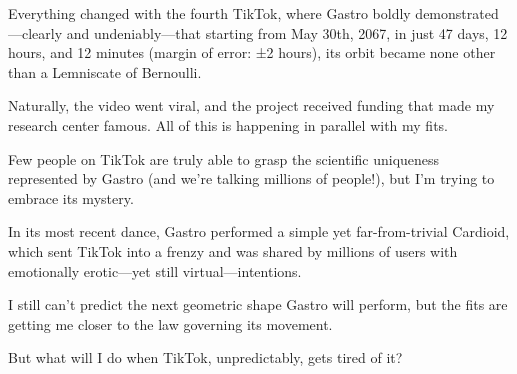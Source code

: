 {Everything changed with the fourth TikTok, where Gastro boldly demonstrated—clearly and undeniably—that starting from May 30th, 2067, in just 47 days, 12 hours, and 12 minutes (margin of error: ±2 hours), its orbit became none other than a Lemniscate of Bernoulli.

Naturally, the video went viral, and the project received funding that made my research center famous. All of this is happening in parallel with my fits.

Few people on TikTok are truly able to grasp the scientific uniqueness represented by Gastro (and we’re talking millions of people!), but I’m trying to embrace its mystery.

In its most recent dance, Gastro performed a simple yet far-from-trivial Cardioid, which sent TikTok into a frenzy and was shared by millions of users with emotionally erotic—yet still virtual—intentions.

I still can’t predict the next geometric shape Gastro will perform, but the fits are getting me closer to the law governing its movement.

But what will I do when TikTok, unpredictably, gets tired of it?}


